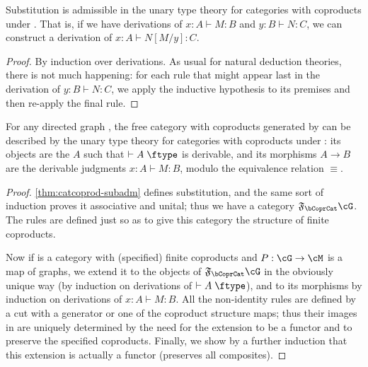 \documentclass{book}
\let\types\vdash
\def\type{\;\ftype}
\newcommand{\F}[1]{\mathfrak{F}_{#1}}
\begin{document}
\begin{lem}\label{thm:catcoprod-subadm}
  Substitution is admissible in the unary type theory for categories with coproducts under \cG.
  That is, if we have derivations of $x:A\types M:B$ and $y:B\types N:C$, we can construct a derivation of $x:A\types N[M/y]:C$.
\end{lem}
\begin{proof}
  By induction over derivations.
  As usual for natural deduction theories, there is not much happening: for each rule that might appear last in the derivation of $y:B\types N:C$, we apply the inductive hypothesis to its premises and then re-apply the final rule.
\end{proof}

\begin{thm}\label{thm:catcoprod-initial}
  For any directed graph \cG, the free category with coproducts generated by \cG can be described by the unary type theory for categories with coproducts under \cG: its objects are the $A$ such that $\types A\type$ is derivable, and its morphisms $A\to B$ are the derivable judgments $x:A\types M:B$, modulo the equivalence relation $\equiv$.
\end{thm}
\begin{proof}
  \cref{thm:catcoprod-subadm} defines substitution, and the same sort of induction proves it associative and unital; thus we have a category $\F\bCoprCat\cG$.
  The rules are defined just so as to give this category the structure of finite coproducts.

  Now if \cM is a category with (specified) finite coproducts and $P:\cG\to\cM$ is a map of graphs, we extend it to the objects of $\F\bCoprCat\cG$ in the obviously unique way (by induction on derivations of $\types A\type$), and to its morphisms by induction on derivations of $x:A\types M:B$.
  All the non-identity rules are defined by a cut with a generator or one of the coproduct structure maps; thus their images in \cM are uniquely determined by the need for the extension to be a functor and to preserve the specified coproducts.
  Finally, we show by a further induction that this extension is actually a functor (preserves all composites).
\end{proof}
\end{document}
